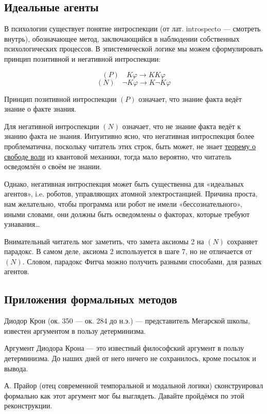 \documentclass[openany]{book}
\theoremstyle{plain}
\theoremstyle{definition}
\begin{document}
\subsection{ Идеальные агенты }

В психологии существует понятие интроспекции (от лат. introspecto — смотреть внутрь), обозначающее метод, заключающийся в наблюдении собственных психологических процессов. В эпистемической логике мы можем сформулировать принцип позитивной и негативной интроспекции:

$$(P) \quad K \varphi \to K K \varphi$$
$$(N) \quad \neg K \varphi \to K \neg K \varphi$$

Принцип позитивной интроспекции \((P)\) означает, что знание факта ведёт знание о факте знания.

Для негативной интроспекции \((N)\) означает, что не знание факта ведёт к знанию факта не знания. Интуитивно ясно, что негативная интроспекция более проблематична, поскольку читатель этих строк, быть может, не знает \href{https://ru.wikipedia.org/wiki/Теорема_о_свободе_воли}{теорему о свободе воли} из квантовой механики, тогда мало вероятно, что читатель осведомлён о своём не знании. 

Однако, негативная интроспекция может быть существенна для «идеальных агентов», i.e. роботов, управляющих атомной электростанцией. Причина проста, нам желательно, чтобы программа или робот не имели «бессознательного», иными словами, они должны быть осведомлены о факторах, которые требуют узнавания\dots

Внимательный читатель мог заметить, что замета аксиомы 2 на \((N)\) сохраняет парадокс. В самом деле, аксиома 2 используется в шаге 7, но не отличается от \((N)\). Словом, парадокс Фитча можно получить разными способами, для разных агентов.

\subsection{ Приложения формальных методов }


Диодор Крон (ок. 350 — ок. 284 до н.э.) — представитель Мегарской школы, известен аргументом в пользу детерминизма.

Аргумент Диодора Крона — это известный философский аргумент в пользу детерминизма.
До наших дней от него ничего не сохранилось, кроме посылок и вывода.

А. Прайор (отец современной темпоральной и модальной логики) сконструировал формально как этот аргумент мог бы выглядеть. Давайте пройдёмся по этой реконструкции.
\end{document}
